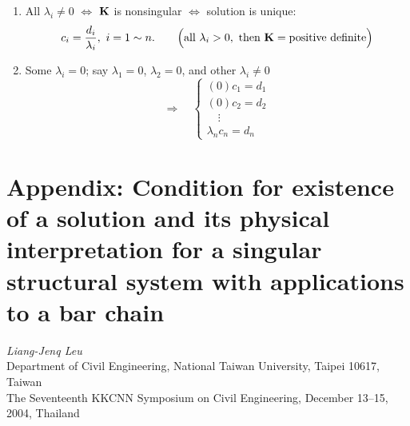 \begin{enumerate}[leftmargin=*]
  \item All $\lambda_i\neq 0$ $\Leftrightarrow$ $\mathbf{K}$ is nonsingular $\Leftrightarrow$ solution is unique:
    \begin{equation*}
      c_i = \frac{d_i}{\lambda_i},\ i = 1\sim n. \qquad\Bigl(\text{all }\lambda_i > 0,\text{ then }\mathbf{K} = \text{positive definite}\Bigr)
    \end{equation*}
  \item Some $\lambda_i = 0$; say $\lambda_1 = 0$, $\lambda_2 = 0$, and other $\lambda_i\neq 0$
    \begin{equation*}
      \Longrightarrow\quad
      \begin{cases}
        (0)c_1 = d_1\\ (0)c_2 = d_2\\ \quad\vdots\\ \lambda_n c_n = d_n
      \end{cases}
    \end{equation*}
\end{enumerate}

\clearpage
\section[Appendix: Existence of a solution for a singular system (Leu, 2004)]{Appendix: Condition for existence of a solution and its physical interpretation for a singular structural system with applications to a bar chain}
\label{sec:leu-paper}
\begin{center}
  \emph{Liang-Jenq Leu}\\
  Department of Civil Engineering, National Taiwan University, Taipei 10617, Taiwan\\[2pt]
  {\small The Seventeenth KKCNN Symposium on Civil Engineering, December 13--15, 2004, Thailand}
\end{center}

